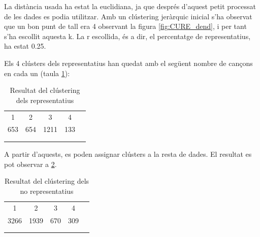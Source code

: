 La distància usada ha estat la euclidiana, ja que després d’aquest petit processat de les dades es podia utilitzar. Amb un  clústering jeràrquic inicial s’ha observat que un bon punt de tall era 4 observant la figura \ref{fig:CURE_dend}, i per tant s’ha escollit aquesta k. La r escollida, és a dir, el percentatge de representatius, ha estat 0.25.

Els 4 clústers dels representatius han quedat amb el següent nombre de cançons en cada un (taula \ref{tab:CURE_taularep}):

\begin{table}[H]
\centering
\begin{tabular}{lllll}
\cline{1-4}
\multicolumn{1}{|c|}{1}   & \multicolumn{1}{c|}{2}   & \multicolumn{1}{c|}{3}    & \multicolumn{1}{c|}{4}   &  \\ \cline{1-4}
\multicolumn{1}{|c|}{653} & \multicolumn{1}{c|}{654} & \multicolumn{1}{c|}{1211} & \multicolumn{1}{c|}{133} &  \\ \cline{1-4}
                          &                          &                           &                          &  \\
                          &                          &                           &                          & 
\end{tabular}
\caption{Resultat del clústering dels representatius}
\label{tab:CURE_taularep}
\end{table}

A partir d’aquests, es poden assignar clústers a la resta de dades. El resultat es pot observar a \ref{tab:CURE_taulanorep}.

\begin{table}[H]
\centering
\begin{tabular}{lllll}
\cline{1-4}
\multicolumn{1}{|c|}{1}    & \multicolumn{1}{c|}{2}    & \multicolumn{1}{c|}{3}   & \multicolumn{1}{c|}{4}   &  \\ \cline{1-4}
\multicolumn{1}{|c|}{3266} & \multicolumn{1}{c|}{1939} & \multicolumn{1}{c|}{670} & \multicolumn{1}{c|}{309} &  \\ \cline{1-4}
                           &                           &                          &                          &  \\
                           &                           &                          &                          & 
\end{tabular}
\caption{Resultat del clústering dels no representatius}
\label{tab:CURE_taulanorep}
\end{table}

